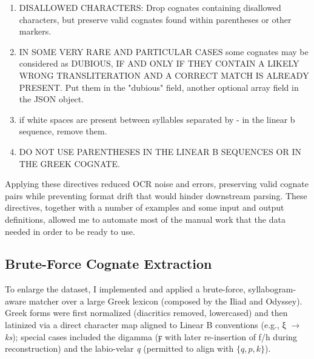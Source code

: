 \begin{enumerate}[label=\textbf{\arabic*.}, leftmargin=2.5em]
\item DISALLOWED CHARACTERS: Drop cognates containing disallowed characters, but preserve valid cognates found within parentheses or other markers.

\item IN SOME VERY RARE AND PARTICULAR CASES some cognates may be considered as DUBIOUS, IF AND ONLY IF THEY CONTAIN A LIKELY WRONG TRANSLITERATION AND A CORRECT MATCH IS ALREADY PRESENT. Put them in the "dubious" field, another optional array field in the JSON object.

\item if white spaces are present between syllables separated by - in the linear b sequence, remove them.

\item DO NOT USE PARENTHESES IN THE LINEAR B SEQUENCES OR IN THE GREEK COGNATE.
\end{enumerate}

Applying these directives reduced OCR noise and errors, preserving valid cognate pairs while preventing format drift that would hinder downstream parsing.
These directives, together with a number of examples and some input and output definitions, allowed me to automate most of the manual work that the data needed in order to be ready to use.

\subsection{Brute-Force Cognate Extraction}

To enlarge the dataset, I implemented and applied a brute-force, syllabogram-aware matcher over a large Greek lexicon (composed by the Iliad and Odyssey).
Greek forms were first normalized (diacritics removed, lowercased) and then latinized via a direct character map aligned to Linear B conventions (e.g., \textgreek{ξ} $\rightarrow$ \textit{ks}); 
special cases included the digamma (\textgreek{ϝ} with later re-insertion of f/h during reconstruction) and the
labio-velar \textit{q} (permitted to align with $\{q,p,k\}$).

